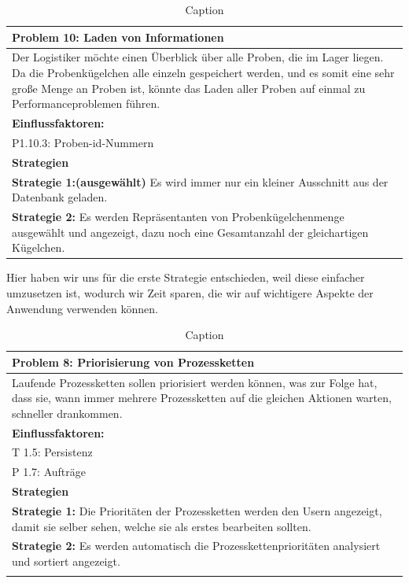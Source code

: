 \documentclass[enabledeprecatedfontcommands,fontsize=12pt,paper=a4,twoside]{scrartcl}
\begin{document}
\begin{table}[]
    \centering
    \begin{tabular}{|p{15cm}|}
    \hline
          \textbf{Problem 10:} Laden von Informationen
          \\ \hline

          Der Logistiker möchte einen Überblick über alle Proben, die im Lager liegen. Da die Probenkügelchen alle einzeln gespeichert werden, und es somit eine sehr große Menge an Proben ist, könnte das Laden aller Proben auf einmal zu Performanceproblemen führen.
        \\  \hline
        \textbf{Einflussfaktoren: } \\
	 P1.10.3: Proben-id-Nummern \\
        \hline
        \textbf{Strategien} \\
         \textbf{Strategie 1:(ausgewählt)} Es wird immer nur ein kleiner Ausschnitt aus der Datenbank geladen. \\
         \textbf{Strategie 2:} Es werden Repräsentanten von Probenkügelchenmenge ausgewählt und angezeigt, dazu noch eine Gesamtanzahl der gleichartigen Kügelchen. \\
    \end{tabular}
    \caption{Caption}
    \label{tab:my_label}
\end{table}
Hier haben wir uns für die erste Strategie entschieden, weil diese einfacher umzusetzen ist, wodurch wir Zeit sparen, die wir auf wichtigere Aspekte der Anwendung verwenden können. 

\begin{table}[H]
    \centering
    \begin{tabular}{|p{15cm}|}
    \hline
          \textbf{Problem 8:} Priorisierung von Prozessketten
          \\ \hline
          Laufende Prozessketten sollen priorisiert werden können, was zur Folge hat, dass sie, wann immer mehrere Prozessketten auf die gleichen Aktionen warten, schneller drankommen. 
          \\ \hline
          \textbf{Einflussfaktoren: } \\
          T 1.5: Persistenz \\
          P 1.7: Aufträge \\
          \hline
          \textbf{Strategien} \\ \hline
          \textbf{Strategie 1:} Die Prioritäten der Prozessketten werden den Usern angezeigt, damit sie selber sehen, welche sie als erstes bearbeiten sollten. \\
          \textbf{Strategie 2:} Es werden automatisch die Prozesskettenprioritäten analysiert und sortiert angezeigt. \\
          \\ \hline
    \end{tabular}
    \caption{Caption}
    \label{tab:my_label}
\end{table}
\end{document}

